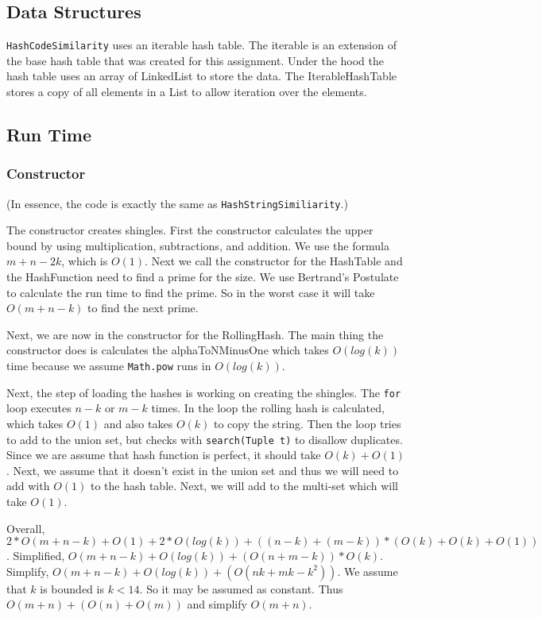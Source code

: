 \documentclass[10pt,letterpaper]{article}
\begin{document}
\subsection{Data Structures}
\texttt{HashCodeSimilarity} uses an iterable hash table. The iterable is an extension of the base hash table that was
created for this assignment. Under the hood the hash table uses an array of LinkedList to store the data. The
IterableHashTable stores a copy of all elements in a List to allow iteration over the elements.
\subsection{Run Time}
\subsubsection{Constructor}
(In essence, the code is exactly the same as \texttt{HashStringSimiliarity}.)

The constructor creates shingles. First the constructor calculates the upper bound by using multiplication, subtractions, and addition. We use the formula $m+n-2k$, which is $O(1)$.
Next we call the constructor for the HashTable and the HashFunction need to find a prime for the size. We use Bertrand's Postulate to calculate the run time to find the prime. So in the worst case it will take $O(m+n-k)$ to find the next prime.

Next, we are now in the constructor for the RollingHash. The main thing the constructor does is
calculates the alphaToNMinusOne which takes $O(log(k))$ time because we assume \texttt{Math.pow} runs in $O(log(k))$.

Next, the step of loading the hashes is working on creating the shingles. The \texttt{for} loop executes $n-k$ or $m-k$ times. In the loop the rolling hash is calculated, which takes $O(1)$ and also takes $O(k)$ to copy the string. Then the loop tries to add to the union set, but checks with \texttt{search(Tuple t)} to disallow duplicates. Since we are assume that hash function is perfect, it should take $O(k) + O(1)$. Next, we assume that it doesn't exist in the union set and thus we will need to add with $O(1)$ to the hash table. Next, we will add to the multi-set which will take $O(1)$. 

Overall, $2*O(m+n-k)+O(1)+2*O(log(k))+((n-k)+(m-k))*(O(k)+O(k)+O(1))$. 
Simplified, $O(m+n-k)+O(log(k))+(O(n+m-k))*O(k)$. 
Simplify, $O(m+n-k)+O(log(k))+(O(nk+mk-k^2))$. We assume that $k$ is bounded is $k<14$. So it may be assumed as constant.
Thus $O(m+n)+(O(n)+O(m))$ and simplify $O(m+n)$.
\end{document}
